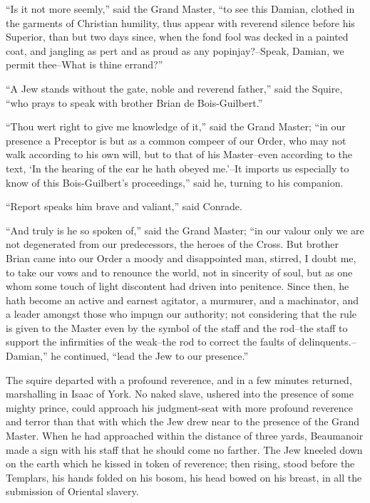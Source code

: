 ``Is it not more seemly,'' said the Grand Master, ``to see this Damian,
clothed in the garments of Christian humility, thus appear with reverend
silence before his Superior, than but two days since, when the fond fool
was decked in a painted coat, and jangling as pert and as proud as any
popinjay?--Speak, Damian, we permit thee--What is thine errand?''

``A Jew stands without the gate, noble and reverend father,'' said the
Squire, ``who prays to speak with brother Brian de Bois-Guilbert.''

``Thou wert right to give me knowledge of it,'' said the Grand Master;
``in our presence a Preceptor is but as a common compeer of our Order,
who may not walk according to his own will, but to that of his
Master--even according to the text, `In the hearing of the ear he hath
obeyed me.'--It imports us especially to know of this Bois-Guilbert's
proceedings,'' said he, turning to his companion.

``Report speaks him brave and valiant,'' said Conrade.

``And truly is he so spoken of,'' said the Grand Master; ``in our valour
only we are not degenerated from our predecessors, the heroes of the
Cross. But brother Brian came into our Order a moody and disappointed
man, stirred, I doubt me, to take our vows and to renounce the world,
not in sincerity of soul, but as one whom some touch of light discontent
had driven into penitence. Since then, he hath become an active and
earnest agitator, a murmurer, and a machinator, and a leader amongst
those who impugn our authority; not considering that the rule is given
to the Master even by the symbol of the staff and the rod--the staff to
support the infirmities of the weak--the rod to correct the faults of
delinquents.--Damian,'' he continued, ``lead the Jew to our presence.''

The squire departed with a profound reverence, and in a few minutes
returned, marshalling in Isaac of York. No naked slave, ushered into the
presence of some mighty prince, could approach his judgment-seat with
more profound reverence and terror than that with which the Jew drew
near to the presence of the Grand Master. When he had approached within
the distance of three yards, Beaumanoir made a sign with his staff that
he should come no farther. The Jew kneeled down on the earth which he
kissed in token of reverence; then rising, stood before the Templars,
his hands folded on his bosom, his head bowed on his breast, in all the
submission of Oriental slavery.

